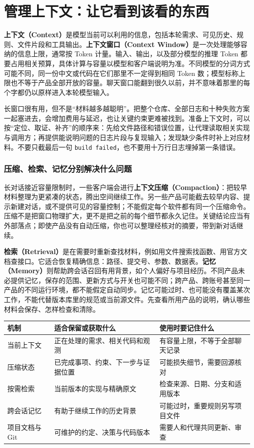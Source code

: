 \section{管理上下文：让它看到该看的东西}
\label{sec:ai-context}

\textbf{上下文（Context）}是模型当前可以利用的信息，包括本轮需求、可见历史、规则、文件片段和工具输出。\textbf{上下文窗口（Context Window）}是一次处理能够容纳的信息上限，通常按 Token 计量。输入、输出，以及部分模型的推理 Token 都要占用相关预算，具体计算与容量以模型和客户端说明为准。不同模型的分词方式可能不同，同一份中文或代码在它们那里不一定得到相同 Token 数；模型标称上限也不等于产品全部开放的容量。聊天窗口能翻到很久以前，并不意味着那里的每个字都仍以原样进入本轮模型输入。

长窗口很有用，但不是“材料越多越聪明”。把整个仓库、全部日志和十种失败方案一起塞进去，会增加费用与延迟，也让关键约束更难被找到。准备上下文时，可以按“定位、取证、补齐”的顺序来：先给文件路径和错误位置，让代理读取相关实现与调用方；再提供能说明问题的日志片段与复现输入；发现缺少条件时补上对应材料。不要只截最后一句 \texttt{build failed}，也不要用十万行日志埋掉第一条错误。

\subsubsection{压缩、检索、记忆分别解决什么问题}

长对话接近容量限制时，一些客户端会进行\textbf{上下文压缩（Compaction）}：把较早材料整理为更紧凑的状态，腾出空间继续工作。另一些产品可能截去较早内容、提示新建对话，或不提供可见的容量控制；不能假定每个软件都有同一个压缩命令。压缩不是把窗口物理扩大，更不是把之前的每个细节都永久记住。关键结论应当有外部落点；即使产品没有自动压缩，你也可以整理经核对的摘要，带到新对话继续。

\textbf{检索（Retrieval）}是在需要时重新查找材料，例如用文件搜索找函数、用官方文档查接口。它适合恢复精确信息：路径、提交号、参数、数据表。\textbf{记忆（Memory）}则帮助跨会话召回有用背景，如个人偏好与项目经历。不同产品未必提供记忆，保存的范围、更新方式与开关也可能不同；跨产品、跨账号甚至同一产品的不同运行环境，都不能假定自动同步。记忆可能过时、也可能没有覆盖某次工作，不能代替版本库里的规范或当前源文件。先查看所用产品的说明，确认哪些材料会保存、怎样检查和清除。

\begin{center}
\begin{tabular}{p{}p{}p{}}
\toprule
机制 & 适合保留或获取什么 & 使用时要记住什么 \\
\midrule
当前上下文 & 正在处理的需求、相关代码和观测 & 有容量上限，不等于全部聊天记录 \\
压缩状态 & 已完成事项、约束、下一步与证据位置 & 可能损失细节，需要回源核对 \\
按需检索 & 当前版本的实现与精确原文 & 检查来源、日期、分支和适用版本 \\
跨会话记忆 & 有助于继续工作的历史背景 & 可能过时，重要规则另写项目文件 \\
项目文档与 Git & 可维护的约定、决策与代码版本 & 需要人和代理共同更新、审查 \\
\bottomrule
\end{tabular}
\end{center}

